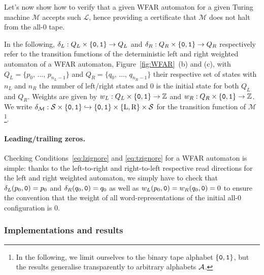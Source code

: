 Let's now show how to verify that a given WFAR automaton for a given Turing machine $\mathcal{M}$ accepts such $\mathcal{L}$, hence providing a certificate that $\mathcal{M}$ does not halt from the all-0 tape.

In the following, $\delta_L: Q_L \times \left\{\texttt{0},\texttt{1}\right\} \to Q_L$ and $\delta_R: Q_R \times \left\{\texttt{0},\texttt{1}\right\} \to Q_R$ respectively refer to the transition functions of the deterministic left and right weighted automaton of a WFAR automaton, \eg Figure~\ref{fig:WFAR}~(b) and (c), with $Q_L = \{p_0, \, \dots, \, p_{n_L-1}\}$ and $Q_R = \{q_0, \, \dots, \, q_{n_R-1}\}$ their respective set of states with $n_L$ and $n_R$ the number of left/right states and $0$ is the initial state for both $Q_L$ and $Q_R$. Weights are given by $w_L: Q_L \times \left\{\texttt{0},\texttt{1}\right\} \to \mathbb{Z}$ and $w_R: Q_R \times \left\{\texttt{0},\texttt{1}\right\} \to \mathbb{Z}$. We write $\delta_\mathcal{M}:\mathcal{S} \times \left\{\texttt{0},\texttt{1}\right\} \hookrightarrow \left\{\texttt{0},\texttt{1}\right\} \times \{\text{L},\text{R}\} \times \mathcal{S}$ for the transition function of $\mathcal{M}$\footnote{In the following, we limit ourselves to the binary tape alphabet $\left\{\texttt{0},\texttt{1}\right\}$, but the results generalise transparently to arbitrary alphabets $\mathcal{A}$.}.

\paragraph{Leading/trailing zeros.} Checking Conditions~\eqref{eq:lzignore} and \eqref{eq:tzignore} for a WFAR automaton is simple: thanks to the left-to-right and right-to-left respective read directions for the left and right weighted automaton, we simply have to check that $\delta_L(p_0,\texttt{0}) = p_0$ and $\delta_R(q_0,\texttt{0}) = q_0$ as well as $w_L(p_0,\texttt{0}) = w_R(q_0,\texttt{0}) = 0$ to ensure the convention that the weight of all word-representations of the initial all-0 configuration is 0.


\subsubsection{Implementations and results}\label{sec:WFAR:results}